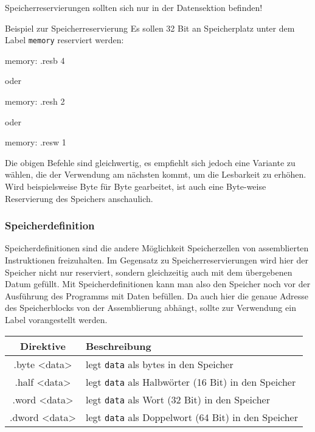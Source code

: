\begin{warningblock}
	Speicherreservierungen sollten sich nur in der Datensektion befinden!
\end{warningblock}

\begin{exampleblock}{Beispiel zur Speicherreservierung}
	Es sollen 32 Bit an Speicherplatz unter dem Label \texttt{memory} reserviert werden:
	\begin{riscv}
	memory: .resb 4
	\end{riscv}
	oder
	\begin{riscv}
	memory: .resh 2
	\end{riscv}
	oder
	\begin{riscv}
	memory: .resw 1
	\end{riscv}
	Die obigen Befehle sind gleichwertig, es empfiehlt sich jedoch eine Variante zu wählen, die der Verwendung am nächsten kommt, um die Lesbarkeit zu erhöhen. Wird beispielsweise Byte für Byte gearbeitet, ist auch eine Byte-weise Reservierung des Speichers anschaulich.
\end{exampleblock}

\subsubsection{Speicherdefinition}

Speicherdefinitionen sind die andere Möglichkeit Speicherzellen von
assemblierten Instruktionen freizuhalten. Im Gegensatz zu Speicherreservierungen
wird hier der Speicher nicht nur reserviert, sondern gleichzeitig auch mit dem
übergebenen Datum gefüllt. Mit Speicherdefinitionen kann man also den Speicher
noch vor der Ausführung des Programms mit Daten befüllen. Da auch hier die
genaue Adresse des Speicherblocks von der Assemblierung abhängt, sollte zur
Verwendung ein Label vorangestellt werden.\\

\begin{table}[H]
  \centering
	\begin{tabular}{>{\ttfamily}cl}
    \textbf{Direktive} & \textbf{Beschreibung}\\
    \toprule
		.byte <data> & legt \texttt{data} als bytes in den Speicher\\
		.half <data> & legt \texttt{data} als Halbwörter (16 Bit) in den Speicher\\
		.word <data> & legt \texttt{data} als Wort (32 Bit) in den Speicher\\
		.dword <data> & legt \texttt{data} als Doppelwort (64 Bit) in den Speicher\\
	\end{tabular}
\end{table}


